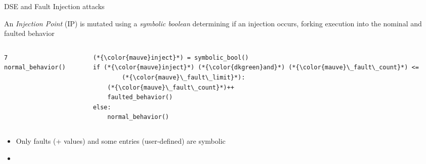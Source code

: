 \begin{frame}[fragile]{DSE and Fault Injection attacks}
\vfill
{\small

    An \textit{Injection Point} (IP) is mutated using a \textit{symbolic boolean} determining if an injection occurs, forking execution into the nominal and faulted behavior
 
    \begin{columns}   
        \begin{column}{0.5\textwidth}
            \begin{lstlisting}7
normal_behavior()






            \end{lstlisting}  
        \end{column}
        \begin{column}{0.5\textwidth}
            \begin{lstlisting}[label=lst-symbool]
(*{\color{mauve}inject}*) = symbolic_bool()
if (*{\color{mauve}inject}*) (*{\color{dkgreen}and}*) (*{\color{mauve}\_fault\_count}*) <= 
        (*{\color{mauve}\_fault\_limit}*):
    (*{\color{mauve}\_fault\_count}*)++
    faulted_behavior()
else:
    normal_behavior()
            \end{lstlisting}  
        \end{column}
    \end{columns}

    \begin{itemize}
        \item[] Only faults (+ values) and some entries (user-defined) are symbolic
        \item[]
    \end{itemize}

}
\end{frame}

